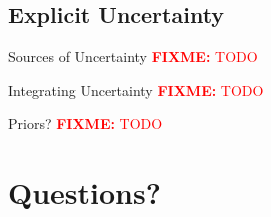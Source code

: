 \documentclass{beamer}
\newcommand\fixme[2][FIXME]{\textcolor{red}{\textbf{#1:} #2}}
\begin{document}
\subsection{Explicit Uncertainty}

\begin{frame}{Sources of Uncertainty}
  \fixme{TODO}
\end{frame}

\begin{frame}{Integrating Uncertainty}
  \fixme{TODO}
\end{frame}

\begin{frame}{Priors?}
  \fixme{TODO}
\end{frame}

\section{Questions?}
\end{document}
